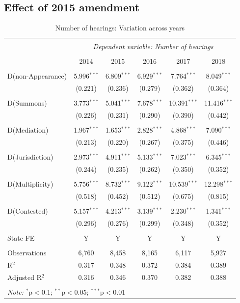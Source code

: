 \documentclass[12pt,a4paper]{article}
\begin{document}
\begin{appendices}
\newpage
\section{Effect of 2015 amendment}
\label{sec:ni2015effect}

{\footnotesize \begin{longtable}{lcc|ccc}
\caption{Number of hearings: Variation across years}\label{tab:hearFE}
\\[-1.8ex]
\hline \\[-1.8ex]
& \multicolumn{5}{c}{\textit{Dependent variable: Number of hearings}} \\
\cline{2-6}
\\[-1.8ex] & 2014 & 2015 & 2016 & 2017 & 2018 \\
\hline \\[-1.8ex]
D(non-Appearance) & 5.996$^{***}$ & 6.809$^{***}$ & 6.929$^{***}$ & 7.764$^{***}$ & 8.049$^{***}$ \\
& (0.221) & (0.236) & (0.279) & (0.362) & (0.364) \\
& & & & & \\
D(Summons) & 3.773$^{***}$ & 5.041$^{***}$ & 7.678$^{***}$ & 10.391$^{***}$ & 11.416$^{***}$ \\
& (0.226) & (0.231) & (0.290) & (0.390) & (0.442) \\
& & & & & \\
D(Mediation) & 1.967$^{***}$ & 1.653$^{***}$ & 2.828$^{***}$ & 4.868$^{***}$ & 7.090$^{***}$ \\
& (0.213) & (0.220) & (0.267) & (0.375) & (0.446) \\
& & & & & \\
D(Jurisdiction) & 2.973$^{***}$ & 4.911$^{***}$ & 5.133$^{***}$ & 7.023$^{***}$ & 6.345$^{***}$ \\
& (0.244) & (0.235) & (0.262) & (0.350) & (0.352) \\
& & & & & \\
D(Multiplicity) & 5.756$^{***}$ & 8.732$^{***}$ & 9.122$^{***}$ & 10.539$^{***}$ & 12.298$^{***}$ \\
& (0.518) & (0.452) & (0.512) & (0.675) & (0.815) \\
& & & & & \\
D(Contested) & 5.157$^{***}$ & 4.213$^{***}$ & 3.139$^{***}$ & 2.230$^{***}$ & 1.341$^{***}$ \\
& (0.296) & (0.276) & (0.299) & (0.348) & (0.352) \\
\hline \\[-1.8ex]
State FE & Y & Y & Y & Y & Y \\
\hline \\[-1.8ex]
Observations & 6,760 & 8,458 & 8,165 & 6,117 & 5,927 \\
R$^{2}$ & 0.317 & 0.348 & 0.372 & 0.384 & 0.389 \\
Adjusted R$^{2}$ & 0.316 & 0.346 & 0.370 & 0.382 & 0.388 \\
\hline \\[-1.8ex]
\multicolumn{6}{l}{\textit{Note:} $^{*}$p$<$0.1; $^{**}$p$<$0.05; $^{***}$p$<$0.01} \\
\end{longtable}
}

\end{appendices}
\end{document}
